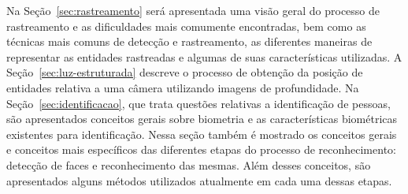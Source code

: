 	Na Seção~\ref{sec:rastreamento} será apresentada uma visão geral do processo de rastreamento e as dificuldades mais comumente encontradas, bem como as técnicas mais comuns de detecção e rastreamento, as diferentes maneiras de representar as entidades rastreadas e algumas de suas características utilizadas. A Seção~\ref{sec:luz-estruturada} descreve o processo de obtenção da posição de entidades relativa a uma câmera utilizando imagens de profundidade. Na Seção~\ref{sec:identificacao}, que trata questões relativas a identificação de pessoas, são apresentados conceitos gerais sobre biometria e as características biométricas existentes para identificação. Nessa seção também é mostrado os conceitos gerais e conceitos mais específicos das diferentes etapas do processo de reconhecimento: detecção de faces e reconhecimento das mesmas. Além desses conceitos, são apresentados alguns métodos utilizados atualmente em cada uma dessas etapas.










